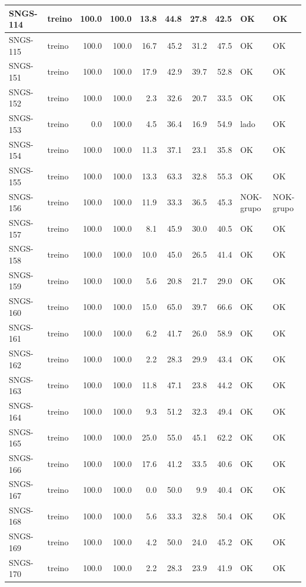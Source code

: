 \begin{small}
\begin{longtable}{|l|l|r|r|r|r|r|r|l|l|}
SNGS-114 & treino & 100.0 & 100.0 & 13.8 & 44.8 & 27.8 & 42.5 & OK & OK \\ \hline
SNGS-115 & treino & 100.0 & 100.0 & 16.7 & 45.2 & 31.2 & 47.5 & OK & OK \\ \hline
SNGS-151 & treino & 100.0 & 100.0 & 17.9 & 42.9 & 39.7 & 52.8 & OK & OK \\ \hline
SNGS-152 & treino & 100.0 & 100.0 & 2.3 & 32.6 & 20.7 & 33.5 & OK & OK \\ \hline
SNGS-153 & treino & 0.0 & 100.0 & 4.5 & 36.4 & 16.9 & 54.9 & lado & OK \\ \hline
SNGS-154 & treino & 100.0 & 100.0 & 11.3 & 37.1 & 23.1 & 35.8 & OK & OK \\ \hline
SNGS-155 & treino & 100.0 & 100.0 & 13.3 & 63.3 & 32.8 & 55.3 & OK & OK \\ \hline
SNGS-156 & treino & 100.0 & 100.0 & 11.9 & 33.3 & 36.5 & 45.3 & NOK-grupo & NOK-grupo \\ \hline
SNGS-157 & treino & 100.0 & 100.0 & 8.1 & 45.9 & 30.0 & 40.5 & OK & OK \\ \hline
SNGS-158 & treino & 100.0 & 100.0 & 10.0 & 45.0 & 26.5 & 41.4 & OK & OK \\ \hline
SNGS-159 & treino & 100.0 & 100.0 & 5.6 & 20.8 & 21.7 & 29.0 & OK & OK \\ \hline
SNGS-160 & treino & 100.0 & 100.0 & 15.0 & 65.0 & 39.7 & 66.6 & OK & OK \\ \hline
SNGS-161 & treino & 100.0 & 100.0 & 6.2 & 41.7 & 26.0 & 58.9 & OK & OK \\ \hline
SNGS-162 & treino & 100.0 & 100.0 & 2.2 & 28.3 & 29.9 & 43.4 & OK & OK \\ \hline
SNGS-163 & treino & 100.0 & 100.0 & 11.8 & 47.1 & 23.8 & 44.2 & OK & OK \\ \hline
SNGS-164 & treino & 100.0 & 100.0 & 9.3 & 51.2 & 32.3 & 49.4 & OK & OK \\ \hline
SNGS-165 & treino & 100.0 & 100.0 & 25.0 & 55.0 & 45.1 & 62.2 & OK & OK \\ \hline
SNGS-166 & treino & 100.0 & 100.0 & 17.6 & 41.2 & 33.5 & 40.6 & OK & OK \\ \hline
SNGS-167 & treino & 100.0 & 100.0 & 0.0 & 50.0 & 9.9 & 40.4 & OK & OK \\ \hline
SNGS-168 & treino & 100.0 & 100.0 & 5.6 & 33.3 & 32.8 & 50.4 & OK & OK \\ \hline
SNGS-169 & treino & 100.0 & 100.0 & 4.2 & 50.0 & 24.0 & 45.2 & OK & OK \\ \hline
SNGS-170 & treino & 100.0 & 100.0 & 2.2 & 28.3 & 23.9 & 41.9 & OK & OK \\ \hline
\end{longtable}
\end{small}

